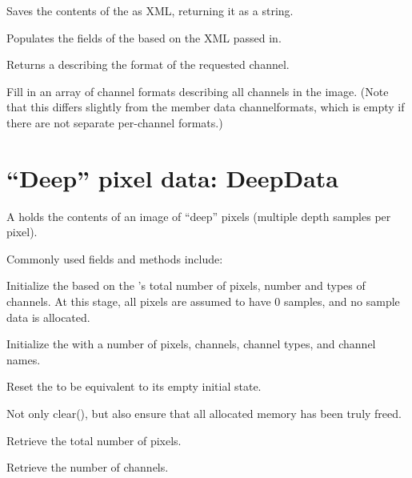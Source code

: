 \apiend

Saves the contents of the \ImageSpec as XML, returning it as a string.
\apiend

Populates the fields of the \ImageSpec based on the XML passed in.
\apiend

Returns a \TypeDesc describing the format of the requested channel.
\apiend

Fill in an array of channel formats describing all channels in the
image.  (Note that this differs slightly from the member data 
{\cf channelformats}, which is empty if there are not separate per-channel
formats.)
\apiend



\section{``Deep'' pixel data: {\cf DeepData}}
\label{sec:deepdata}

A \DeepData holds the contents of an image of ``deep'' pixels (multiple
depth samples per pixel).

\noindent Commonly used \DeepData fields and methods include:

Initialize the \DeepData based on the \ImageSpec's total number of pixels,
number and types of channels. At this stage, all pixels are assumed to
have 0 samples, and no sample data is allocated.
\apiend

Initialize the \DeepData with a number of pixels, channels, channel
types, and channel names.
\apiend

Reset the \DeepData to be equivalent to its empty initial state.
\apiend

Not only {\cf clear()}, but also ensure that all allocated memory has been
truly freed.
\apiend

Retrieve the total number of pixels.
\apiend

Retrieve the number of channels.
\apiend

